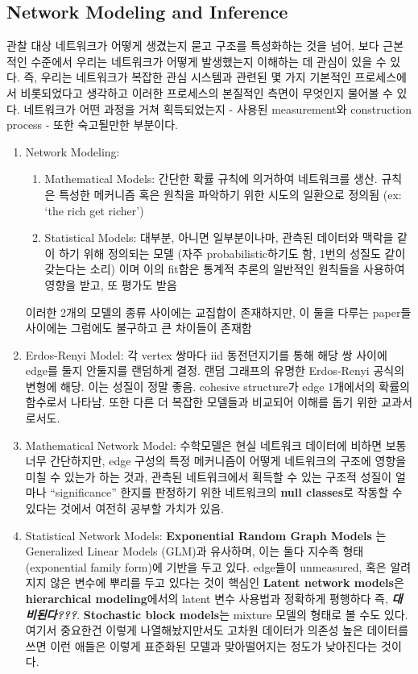 \documentclass[
]{book}
\begin{document}
{{{\hypertarget{network-modeling-and-inference}{%
\subsection{Network Modeling and Inference}\label{network-modeling-and-inference}}

관찰 대상 네트워크가 어떻게 생겼는지 묻고 구조를 특성화하는 것을 넘어, 보다 근본적인 수준에서 우리는 네트워크가 어떻게 발생했는지 이해하는 데 관심이 있을 수 있다. 즉, 우리는 네트워크가 복잡한 관심 시스템과 관련된 몇 가지 기본적인 프로세스에서 비롯되었다고 생각하고 이러한 프로세스의 본질적인 측면이 무엇인지 물어볼 수 있다. 네트워크가 어떤 과정을 거쳐 획득되었는지 - 사용된 measurement와 construction process - 또한 숙고될만한 부분이다.

\begin{enumerate}
\def\labelenumi{\arabic{enumi}.}
\item
  Network Modeling:

  \begin{enumerate}
  \def\labelenumii{\alph{enumii}.}
  \item
    Mathematical Models: 간단한 확률 규칙에 의거하여 네트워크를 생산. 규칙은 특성한 메커니즘 혹은 원칙을 파악하기 위한 시도의 일환으로 정의됨 (ex: `the rich get richer')
  \item
    Statistical Models: 대부분, 아니면 일부분이나마, 관측된 데이터와 맥락을 같이 하기 위해 정의되는 모델 (자주 probabilistic하기도 함, 1번의 성질도 같이 갖는다는 소리) 이며 이의 fit함은 통계적 추론의 일반적인 원칙들을 사용하여 영향을 받고, 또 평가도 받음
  \end{enumerate}

  이러한 2개의 모델의 종류 사이에는 교집합이 존재하지만, 이 둘을 다루는 paper들 사이에는 그럼에도 불구하고 큰 차이들이 존재함
\item
  Erdos-Renyi Model: 각 vertex 쌍마다 iid 동전던지기를 통해 해당 쌍 사이에 edge를 둘지 안둘지를 랜덤하게 결정. 랜덤 그래프의 유명한 Erdos-Renyi 공식의 변형에 해당. 이는 성질이 정말 좋음. cohesive structure가 edge 1개에서의 확률의 함수로서 나타남. 또한 다른 더 복잡한 모델들과 비교되어 이해를 돕기 위한 교과서로서도.
\item
  Mathematical Network Model: 수학모델은 현실 네트워크 데이터에 비하면 보통 너무 간단하지만, edge 구성의 특정 메커니즘이 어떻게 네트워크의 구조에 영향을 미칠 수 있는가 하는 것과, 관측된 네트워크에서 획득할 수 있는 구조적 성질이 얼마나 ``significance'' 한지를 판정하기 위한 네트워크의 \textbf{null classes}로 작동할 수 있다는 것에서 여전히 공부할 가치가 있음.
\item
  Statistical Network Models: \textbf{Exponential Random Graph Models} 는 Generalized Linear Models (GLM)과 유사하며, 이는 둘다 지수족 형태(exponential family form)에 기반을 두고 있다. edge들이 unmeasured, 혹은 알려지지 않은 변수에 뿌리를 두고 있다는 것이 핵심인 \textbf{Latent network models}은 \textbf{hierarchical modeling}에서의 latent 변수 사용법과 정확하게 평행하다 즉, \textbf{\emph{대비된다???}}. \textbf{Stochastic block models}는 mixture 모델의 형태로 볼 수도 있다. 여기서 중요한건 이렇게 나열해놨지만서도 고차원 데이터가 의존성 높은 데이터를 쓰면 이런 애들은 이렇게 표준화된 모델과 맞아떨어지는 정도가 낮아진다는 것이다.
\end{enumerate}

}}}
\end{document}
